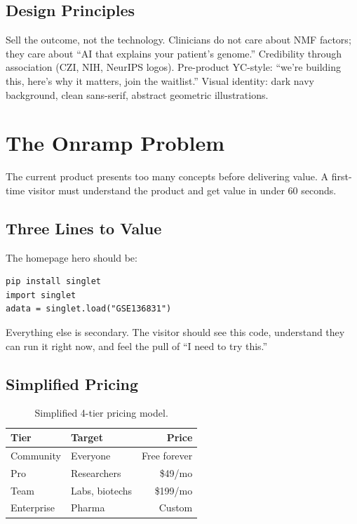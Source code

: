 \documentclass[10pt,twocolumn,letterpaper]{article}
\begin{document}
\subsection{Design Principles}

Sell the outcome, not the technology. Clinicians do not care about NMF factors;
they care about ``AI that explains your patient's genome.'' Credibility through
association (CZI, NIH, NeurIPS logos). Pre-product YC-style: ``we're building
this, here's why it matters, join the waitlist.'' Visual identity: dark
navy background, clean sans-serif, abstract geometric illustrations.

\section{The Onramp Problem}
\label{sec:onramp}

The current product presents too many concepts before delivering value. A
first-time visitor must understand the product and get value in under 60 seconds.

\subsection{Three Lines to Value}

The homepage hero should be:

\begin{verbatim}
pip install singlet
import singlet
adata = singlet.load("GSE136831")
\end{verbatim}

Everything else is secondary. The visitor should see this code, understand they
can run it right now, and feel the pull of ``I need to try this.''

\subsection{Simplified Pricing}

\begin{table}[h]
\centering
\small
\begin{tabular}{@{}llr@{}}
\toprule
\textbf{Tier} & \textbf{Target} & \textbf{Price} \\
\midrule
Community & Everyone & Free forever \\
Pro & Researchers & \$49/mo \\
Team & Labs, biotechs & \$199/mo \\
Enterprise & Pharma & Custom \\
\bottomrule
\end{tabular}
\caption{Simplified 4-tier pricing model.}
\label{tab:pricing}
\end{table}
\end{document}

